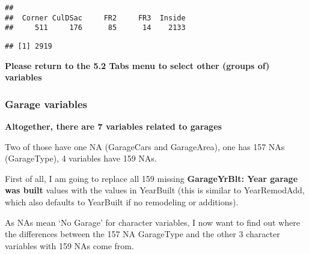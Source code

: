 \documentclass[]{article}
\newenvironment{Shaded}{\begin{snugshade}}{\end{snugshade}}
\newcommand{\KeywordTok}[1]{\textcolor[rgb]{0.13,0.29,0.53}{\textbf{#1}}}
\newcommand{\StringTok}[1]{\textcolor[rgb]{0.31,0.60,0.02}{#1}}
\newcommand{\CommentTok}[1]{\textcolor[rgb]{0.56,0.35,0.01}{\textit{#1}}}
\newcommand{\OperatorTok}[1]{\textcolor[rgb]{0.81,0.36,0.00}{\textbf{#1}}}
\newcommand{\NormalTok}[1]{#1}
\begin{document}
\begin{verbatim}
## 
##  Corner CulDSac     FR2     FR3  Inside 
##     511     176      85      14    2133
\end{verbatim}

\begin{Shaded}
\end{Shaded}

\begin{verbatim}
## [1] 2919
\end{verbatim}

\textbf{Please return to the 5.2 Tabs menu to select other (groups of)
variables}

\subsubsection{Garage variables}\label{garage-variables}

\textbf{Altogether, there are 7 variables related to garages}

Two of those have one NA (GarageCars and GarageArea), one has 157 NAs
(GarageType), 4 variables have 159 NAs.

First of all, I am going to replace all 159 missing \textbf{GarageYrBlt:
Year garage was built} values with the values in YearBuilt (this is
similar to YearRemodAdd, which also defaults to YearBuilt if no
remodeling or additions).

\begin{Shaded}
\end{Shaded}

As NAs mean `No Garage' for character variables, I now want to find out
where the differences between the 157 NA GarageType and the other 3
character variables with 159 NAs come from.

\begin{Shaded}
\end{Shaded}
\end{document}
